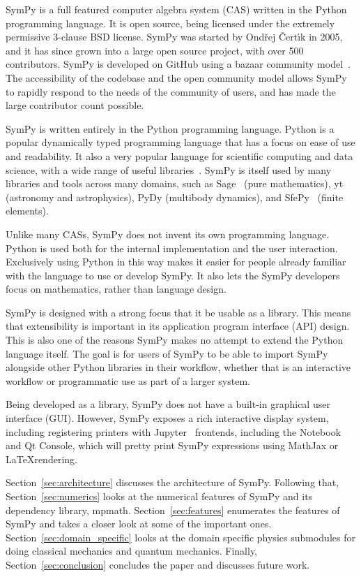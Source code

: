 SymPy is a full featured computer algebra system (CAS) written in the Python
programming language. It is open source, being licensed under the extremely
permissive 3-clause BSD license.
SymPy was started by Ond\v{r}ej \v{C}ert\'{\i}k in 2005, and it has since
grown into a large open source project, with over 500 contributors. SymPy is
developed on GitHub using a bazaar community
model~\cite{raymond1999cathedral}. The accessibility of the codebase and the
open community model allows SymPy to rapidly respond to the needs of the
community of users, and has made the large contributor count possible.

SymPy is written entirely in the Python programming language.
Python is a popular dynamically typed programming language that has a focus on
ease of use and readability. It also a very popular language for scientific
computing and data science, with a wide range of useful
libraries~\cite{oliphant2007python}. SymPy is itself used by many libraries
and tools across many domains, such as Sage~\cite{SAGE} (pure mathematics),
yt~\cite{2011ApJS..192....9T} (astronomy and astrophysics), PyDy
(multibody
dynamics), and SfePy~\cite{cimrman2014sfepy} (finite elements).

Unlike many CASs, SymPy does not invent its own programming language. Python
is used both for the internal implementation and the user interaction.
Exclusively using Python in this way makes it easier for people already
familiar with the language to use or develop SymPy. It also lets the SymPy
developers focus on mathematics, rather than language design.

SymPy is designed with a strong focus that it be usable as a library. This
means that extensibility is important in its application program interface
(API) design. This is also one of the reasons SymPy makes no attempt to extend
the Python language itself. The goal is for users of SymPy to be able to
import SymPy alongside other Python libraries in their workflow, whether that
is an interactive workflow or programmatic use as part of a larger system.

Being developed as a library, SymPy does not have a built-in graphical user
interface (GUI).  However, SymPy exposes a rich interactive display system,
including registering printers with Jupyter~\cite{perez2007ipython} frontends,
including the Notebook and Qt Console, which will pretty print SymPy expressions
using MathJax or \LaTeX rendering.

Section~\ref{sec:architecture} discusses the architecture of SymPy. Following
that, Section~\ref{sec:numerics} looks at the numerical features of SymPy and
its dependency library, mpmath. Section~\ref{sec:features} enumerates the
features of SymPy and takes a closer look at some of the important ones.
Section~\ref{sec:domain_specific} looks at the domain specific physics
submodules for doing classical mechanics and quantum mechanics. Finally,
Section~\ref{sec:conclusion} concludes the paper and discusses future work.
